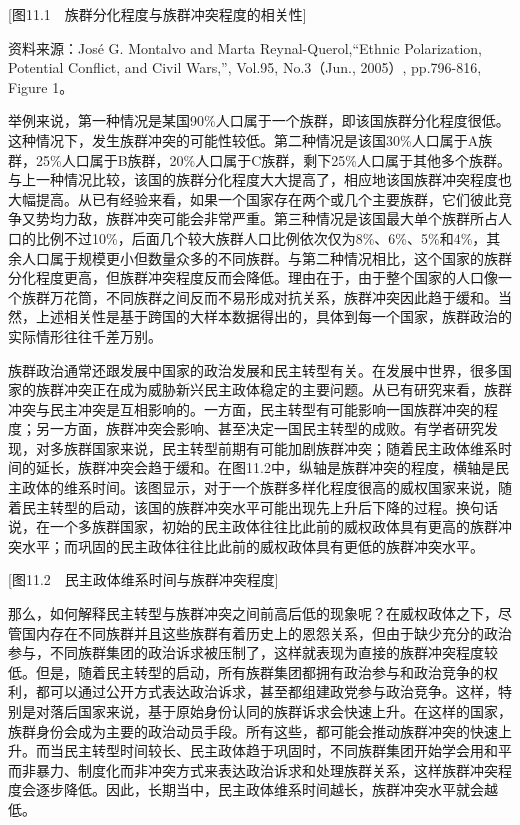 [图11.1　族群分化程度与族群冲突程度的相关性]

资料来源：José G. Montalvo and Marta Reynal-Querol,“Ethnic Polarization, Potential Conflict, and Civil Wars,”, Vol.95, No.3（Jun., 2005）, pp.796-816, Figure 1。

举例来说，第一种情况是某国90\%人口属于一个族群，即该国族群分化程度很低。这种情况下，发生族群冲突的可能性较低。第二种情况是该国30\%人口属于A族群，25\%人口属于B族群，20\%人口属于C族群，剩下25\%人口属于其他多个族群。与上一种情况比较，该国的族群分化程度大大提高了，相应地该国族群冲突程度也大幅提高。从已有经验来看，如果一个国家存在两个或几个主要族群，它们彼此竞争又势均力敌，族群冲突可能会非常严重。第三种情况是该国最大单个族群所占人口的比例不过10\%，后面几个较大族群人口比例依次仅为8\%、6\%、5\%和4\%，其余人口属于规模更小但数量众多的不同族群。与第二种情况相比，这个国家的族群分化程度更高，但族群冲突程度反而会降低。理由在于，由于整个国家的人口像一个族群万花筒，不同族群之间反而不易形成对抗关系，族群冲突因此趋于缓和。当然，上述相关性是基于跨国的大样本数据得出的，具体到每一个国家，族群政治的实际情形往往千差万别。

族群政治通常还跟发展中国家的政治发展和民主转型有关。在发展中世界，很多国家的族群冲突正在成为威胁新兴民主政体稳定的主要问题。从已有研究来看，族群冲突与民主冲突是互相影响的。一方面，民主转型有可能影响一国族群冲突的程度；另一方面，族群冲突会影响、甚至决定一国民主转型的成败。有学者研究发现，对多族群国家来说，民主转型前期有可能加剧族群冲突；随着民主政体维系时间的延长，族群冲突会趋于缓和。在图11.2中，纵轴是族群冲突的程度，横轴是民主政体的维系时间。该图显示，对于一个族群多样化程度很高的威权国家来说，随着民主转型的启动，该国的族群冲突水平可能出现先上升后下降的过程。换句话说，在一个多族群国家，初始的民主政体往往比此前的威权政体具有更高的族群冲突水平；而巩固的民主政体往往比此前的威权政体具有更低的族群冲突水平。

[图11.2　民主政体维系时间与族群冲突程度]

那么，如何解释民主转型与族群冲突之间前高后低的现象呢？在威权政体之下，尽管国内存在不同族群并且这些族群有着历史上的恩怨关系，但由于缺少充分的政治参与，不同族群集团的政治诉求被压制了，这样就表现为直接的族群冲突程度较低。但是，随着民主转型的启动，所有族群集团都拥有政治参与和政治竞争的权利，都可以通过公开方式表达政治诉求，甚至都组建政党参与政治竞争。这样，特别是对落后国家来说，基于原始身份认同的族群诉求会快速上升。在这样的国家，族群身份会成为主要的政治动员手段。所有这些，都可能会推动族群冲突的快速上升。而当民主转型时间较长、民主政体趋于巩固时，不同族群集团开始学会用和平而非暴力、制度化而非冲突方式来表达政治诉求和处理族群关系，这样族群冲突程度会逐步降低。因此，长期当中，民主政体维系时间越长，族群冲突水平就会越低。

